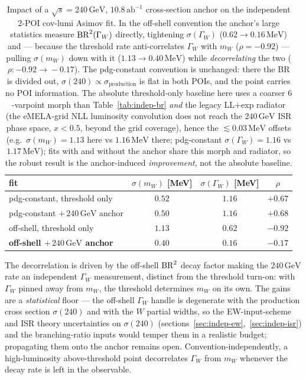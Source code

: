 \documentclass[11pt,a4paper]{article}
\newcommand{\mW}{m_W}
\newcommand{\GammaW}{\Gamma_W}
\newcommand{\sqrts}{\sqrt{s}}
\newcommand{\GeV}{\ensuremath{\,\mathrm{GeV}}}
\newcommand{\MeV}{\ensuremath{\,\mathrm{MeV}}}
\begin{document}
\begin{table}[t]
\centering
\begin{tabular}{l c c c}
\toprule
fit & $\sigma(\mW)$ [MeV] & $\sigma(\GammaW)$ [MeV] & $\rho$ \\
\midrule
pdg-constant, threshold only          & $0.52$ & $1.16$ & $+0.67$ \\
pdg-constant $+\,240\GeV$ anchor       & $0.50$ & $1.16$ & $+0.68$ \\
off-shell, threshold only             & $1.13$ & $0.62$ & $-0.92$ \\
\textbf{off-shell $+\,240\GeV$ anchor} & $\mathbf{0.40}$ & $\mathbf{0.16}$ & $\mathbf{-0.17}$ \\
\bottomrule
\end{tabular}
\caption{Impact of a $\sqrts=240\GeV$, $10.8\,\text{ab}^{-1}$ cross-section anchor
on the independent 2-POI cov-lumi Asimov fit. In the off-shell convention the
anchor's large statistics measure ${\rm BR}^2(\GammaW)$ directly, tightening
$\sigma(\GammaW)$ ($0.62\!\to\!0.16\MeV$) and --- because the threshold rate
anti-correlates $\GammaW$ with $\mW$ ($\rho=-0.92$) --- pulling $\sigma(\mW)$ down
with it ($1.13\!\to\!0.40\MeV$) while \emph{decorrelating} the two
($\rho:-0.92\!\to\!-0.17$). The pdg-constant convention is unchanged: there the BR
is divided out, $\sigma(240)\propto\sigma_\text{production}$ is flat in both POIs,
and the point carries no POI information. The absolute threshold-only baseline
here uses a coarser $6$-varpoint morph than Table~\ref{tab:indep-br} \emph{and} the
legacy LL$+$exp radiator (the eMELA-grid NLL luminosity convolution does not reach
the $240\GeV$ ISR phase space, $x<0.5$, beyond the grid coverage), hence the
$\lesssim\!0.03\MeV$ offsets (e.g.\ $\sigma(\mW)=1.13$ here vs $1.16\MeV$ there;
pdg-constant $\sigma(\GammaW)=1.16$ vs $1.17\MeV$); fits with and without the anchor
share this morph and radiator, so the robust result is the anchor-induced
\emph{improvement}, not the absolute baseline.}
\label{tab:indep-anchor}
\end{table}

The decorrelation is driven by the off-shell ${\rm BR}^2$ decay factor making
the $240\GeV$ rate an independent $\GammaW$ measurement, distinct from the
threshold turn-on: with $\GammaW$ pinned away from $\mW$, the threshold determines
$\mW$ on its own. The gains are a \emph{statistical} floor --- the off-shell
$\GammaW$ handle is degenerate with the production cross section $\sigma(240)$ and
with the $W$ partial widths, so the EW-input-scheme and ISR theory uncertainties on
$\sigma(240)$ (sections~\ref{sec:indep-ew},~\ref{sec:indep-isr}) and the
branching-ratio inputs would temper them in a realistic budget; propagating them
onto the anchor remains open. Convention-independently, a high-luminosity
above-threshold point decorrelates $\GammaW$ from $\mW$ whenever the decay rate
is left in the observable.
\end{document}
